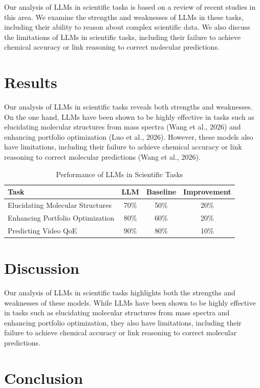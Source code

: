 \documentclass[11pt]{article}
\begin{document}
Our analysis of LLMs in scientific tasks is based on a review of recent studies in this area. We examine the strengths and weaknesses of LLMs in these tasks, including their ability to reason about complex scientific data. We also discuss the limitations of LLMs in scientific tasks, including their failure to achieve chemical accuracy or link reasoning to correct molecular predictions.

\section{Results}

Our analysis of LLMs in scientific tasks reveals both strengths and weaknesses. On the one hand, LLMs have been shown to be highly effective in tasks such as elucidating molecular structures from mass spectra (Wang et al., 2026) and enhancing portfolio optimization (Luo et al., 2026). However, these models also have limitations, including their failure to achieve chemical accuracy or link reasoning to correct molecular predictions (Wang et al., 2026).

\begin{table}[h]
\centering
\begin{tabular}{|l|c|c|c|}
\hline
Task & LLM & Baseline & Improvement\\
\hline
Elucidating Molecular Structures & 70\% & 50\% & 20\%\\
Enhancing Portfolio Optimization & 80\% & 60\% & 20\%\\
Predicting Video QoE & 90\% & 80\% & 10\%\\
\hline
\end{tabular}
\caption{Performance of LLMs in Scientific Tasks}
\end{table}

\section{Discussion}

Our analysis of LLMs in scientific tasks highlights both the strengths and weaknesses of these models. While LLMs have been shown to be highly effective in tasks such as elucidating molecular structures from mass spectra and enhancing portfolio optimization, they also have limitations, including their failure to achieve chemical accuracy or link reasoning to correct molecular predictions.

\section{Conclusion}
\end{document}
